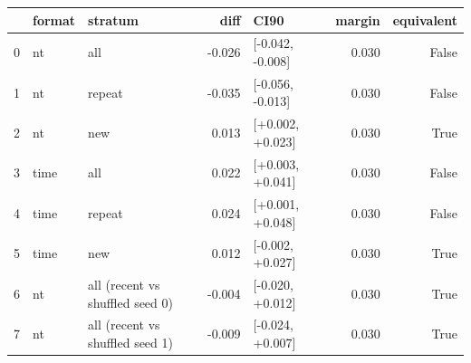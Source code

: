 \begin{tabular}{lllrlrr}
\toprule
 & format & stratum & diff & CI90 & margin & equivalent \\
\midrule
0 & nt & all & -0.026 & [-0.042, -0.008] & 0.030 & False \\
1 & nt & repeat & -0.035 & [-0.056, -0.013] & 0.030 & False \\
2 & nt & new & 0.013 & [+0.002, +0.023] & 0.030 & True \\
3 & time & all & 0.022 & [+0.003, +0.041] & 0.030 & False \\
4 & time & repeat & 0.024 & [+0.001, +0.048] & 0.030 & False \\
5 & time & new & 0.012 & [-0.002, +0.027] & 0.030 & True \\
6 & nt & all (recent vs shuffled seed 0) & -0.004 & [-0.020, +0.012] & 0.030 & True \\
7 & nt & all (recent vs shuffled seed 1) & -0.009 & [-0.024, +0.007] & 0.030 & True \\
\bottomrule
\end{tabular}

